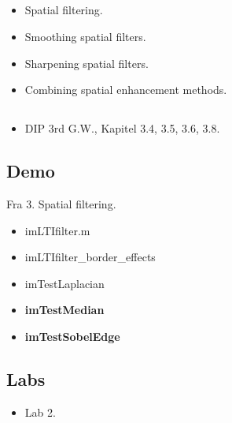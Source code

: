 \subsection{\subtopics}

\begin{itemize}
	\item Spatial filtering.
	\item Smoothing spatial filters.
	\item Sharpening spatial filters.
	\item Combining spatial enhancement methods.
\end{itemize}

\subsection{\curriculum}

\begin{itemize}
	\item DIP 3rd G.W., Kapitel 3.4, 3.5, 3.6, 3.8.
\end{itemize}

\subsection{Demo}

Fra 3. Spatial filtering.

\begin{itemize}
	\item imLTIfilter.m
	\item imLTIfilter\_border\_effects
	\item imTestLaplacian
	\item \textbf{imTestMedian}
	\item \textbf{imTestSobelEdge}
\end{itemize}

\subsection{Labs}

\begin{itemize}
	\item Lab 2.
\end{itemize}